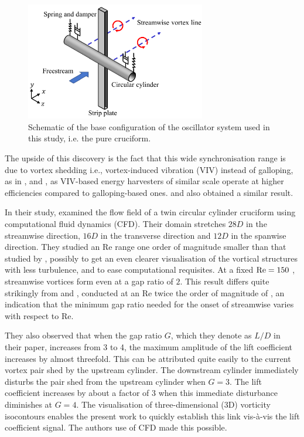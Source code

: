 \documentclass[oneside]{utmthesis}
\begin{document}
\begin{figure}[!h]
  \centering
  \hspace{1cm} \includegraphics[width=0.7\textwidth]{figs/oscillatorSchematic}
  \caption{Schematic of the base configuration of the oscillator system used in this study, i.e. the pure cruciform.}
  \label{fig:oscillatorSchematic}
\end{figure}

The upside of this discovery is the fact that this wide synchronisation range is due to vortex shedding i.e., vortex-induced vibration (VIV) instead of galloping, as in \citet{Sun2019b}, \citet{Xu2019} and \citet{Ding2019}, as VIV-based energy harvesters of similar scale operate at higher efficiencies compared to galloping-based ones. \citet{Sun2016} and \citet{Ma2016} also obtained a similar result.

In their study, \citet{Deng2007} examined the flow field of a twin circular cylinder cruciform using computational fluid dynamics (CFD). Their domain stretches  $28D$  in the streamwise direction,  $16D$  in the transverse direction and  $12D$  in the spanwise direction. They studied an Re range one order of magnitude smaller than that studied by \citet{Koide2017}, possibly to get an even clearer visualisation of the vortical structures with less turbulence, and to ease computational requisites. At a fixed  $\text{Re} = 150$ , streamwise vortices form even at a gap ratio of $2$. This result differs quite strikingly from \citet{Koide2006} and \citet{Koide2007}, conducted at an Re twice the order of magnitude of \citet{Deng2007}, an indication that the minimum gap ratio needed for the onset of streamwise varies with respect to Re.

They also observed that when the gap ratio $G$, which they denote as  $L/D$  in their paper, increases from 3 to 4, the maximum amplitude of the lift coefficient increases by almost threefold. This can be attributed quite easily to the current vortex pair shed by the upstream cylinder. The downstream cylinder immediately disturbs the pair shed from the upstream cylinder when  $G=3$. The lift coefficient increases by about a factor of 3 when this immediate disturbance diminishes at  $G=4$. The visualisation of three-dimensional (3D) vorticity isocontours enables the present work to quickly establish this link vis-\`{a}-vis the lift coefficient signal. The authors use of CFD made this possible.
\end{document}
